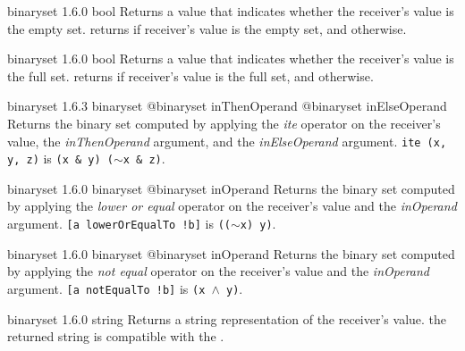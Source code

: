 {binaryset}
{1.6.0}
{bool}
{Returns a  value that indicates whether the receiver's value is the empty set.}
{returns  if receiver's value is the empty set, and  otherwise.}







{binaryset}
{1.6.0}
{bool}
{Returns a  value that indicates whether the receiver's value is the full set.}
{returns  if receiver's value is the full set, and  otherwise.}







{binaryset}
{1.6.3}
{binaryset}
{@binaryset inThenOperand}
{@binaryset inElseOperand}
{Returns the binary set computed by applying the \emph{ite} operator on the receiver's value, the \emph{inThenOperand} argument, and the  \emph{inElseOperand} argument.}
{\texttt{ite (x, y, z)} is \texttt{(x \& y) \textbar ($\sim$x \& z)}.}







{binaryset}
{1.6.0}
{binaryset}
{@binaryset inOperand}
{Returns the binary set computed by applying the \emph{lower or equal} operator on the receiver's value and the \emph{inOperand} argument.}
{\texttt{[a lowerOrEqualTo !b]} is \texttt{(($\sim$x) \textbar y)}.}







{binaryset}
{1.6.0}
{binaryset}
{@binaryset inOperand}
{Returns the binary set computed by applying the \emph{not equal} operator on the receiver's value and the \emph{inOperand} argument.}
{\texttt{[a notEqualTo !b]} is \texttt{(x $\wedge$ y)}.}







{binaryset}
{1.6.0}
{string}
{Returns a string representation of the receiver's value.}
{the returned string is compatible with the .}







